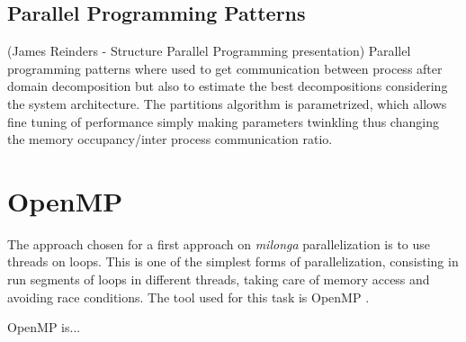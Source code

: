 \documentclass{anstrans}
\renewcommand{\vec}[1]{\bm{#1}} %
\newcommand{\vd}{\bm{\cdot}} %
\newcommand{\grad}{\vec{\nabla}} %
\newcommand{\ud}{\mathop{}\!\mathrm{d}} %
\begin{document}
\subsection{Parallel Programming Patterns}
(James Reinders - Structure Parallel Programming presentation)
Parallel programming patterns where used to get communication between process after
domain decomposition but also to estimate the best decompositions considering the system
architecture. The partitions algorithm is parametrized, which allows fine tuning of performance
simply making parameters twinkling thus changing the memory occupancy/inter process communication ratio.




\section{OpenMP}

The approach chosen for a first approach on \textit{milonga} parallelization
is to use threads on loops. This is one of the simplest forms of parallelization,
consisting in run segments of loops in different threads, taking care of memory
access and avoiding race conditions. The tool used for this task is OpenMP
\cite{Dagum1998}.

OpenMP is...



\end{document}
